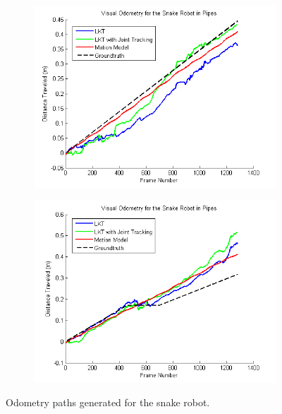 \documentclass[letterpaper, 10 pt, conference]{ieeeconf}
\begin{document}
\begin{figure}[tb]
	\centering
	\begin{subfigure}{\columnwidth}
		  \centering
		  \includegraphics[width=\columnwidth]{trial8_path.png}
		  \label{snakes:trial8_path}
	\end{subfigure}
	\begin{subfigure}{\columnwidth}
		  \centering
		  \includegraphics[width=\columnwidth]{trial9_path.png}
		  \label{snakes:trial9_path}
	\end{subfigure}
	\caption{Odometry paths generated for the snake robot.}
    \label{snakes_path}
\end{figure}
\end{document}
